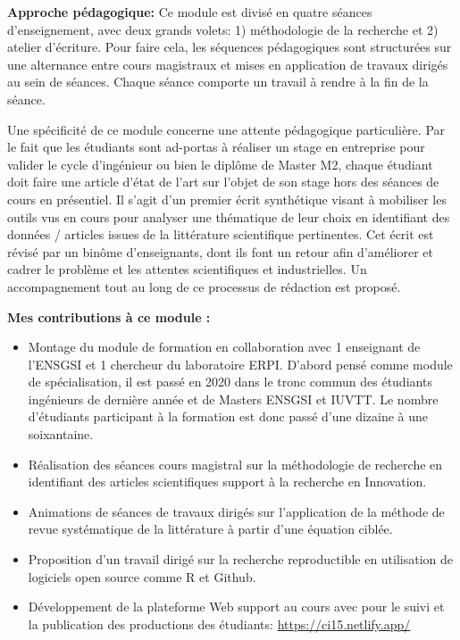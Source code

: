 \documentclass[
  11pt,
]{article}
\providecommand{\tightlist}{%
  \setlength{\itemsep}{0pt}\setlength{\parskip}{0pt}}\usepackage{longtable,booktabs,array}
\begin{document}
\textbf{Approche pédagogique:} Ce module est divisé en quatre séances
d'enseignement, avec deux grands volets: 1) méthodologie de la recherche
et 2) atelier d'écriture. Pour faire cela, les séquences pédagogiques
sont structurées sur une alternance entre cours magistraux et mises en
application de travaux dirigés au sein de séances. Chaque séance
comporte un travail à rendre à la fin de la séance.

Une spécificité de ce module concerne une attente pédagogique
particulière. Par le fait que les étudiants sont ad-portas à réaliser un
stage en entreprise pour valider le cycle d'ingénieur ou bien le diplôme
de Master M2, chaque étudiant doit faire une article d'état de l'art sur
l'objet de son stage hors des séances de cours en présentiel. Il s'agit
d'un premier écrit synthétique visant à mobiliser les outils vus en
cours pour analyser une thématique de leur choix en identifiant des
données / articles issues de la littérature scientifique pertinentes.
Cet écrit est révisé par un binôme d'enseignants, dont ils font un
retour afin d'améliorer et cadrer le problème et les attentes
scientifiques et industrielles. Un accompagnement tout au long de ce
processus de rédaction est proposé.

\textbf{Mes contributions à ce module :}

\begin{itemize}
\tightlist
\item
  Montage du module de formation en collaboration avec 1 enseignant de
  l'ENSGSI et 1 chercheur du laboratoire ERPI. D'abord pensé comme
  module de spécialisation, il est passé en 2020 dans le tronc commun
  des étudiants ingénieurs de dernière année et de Masters ENSGSI et
  IUVTT. Le nombre d'étudiants participant à la formation est donc passé
  d'une dizaine à une soixantaine.
\item
  Réalisation des séances cours magistral sur la méthodologie de
  recherche en identifiant des articles scientifiques support à la
  recherche en Innovation.
\item
  Animations de séances de travaux dirigés sur l'application de la
  méthode de revue systématique de la littérature à partir d'une
  équation ciblée.
\item
  Proposition d'un travail dirigé sur la recherche reproductible en
  utilisation de logiciels open source comme R et Github.
\item
  Développement de la plateforme Web support au cours avec pour le suivi
  et la publication des productions des étudiants:
  \url{https://ci15.netlify.app/}
\end{itemize}
\end{document}
